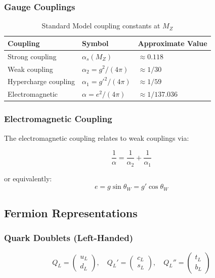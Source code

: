 \subsubsection{Gauge Couplings}

\begin{table}[h]
\centering
\begin{tabular}{|l|l|l|}
\hline
\textbf{Coupling} & \textbf{Symbol} & \textbf{Approximate Value} \\
\hline
Strong coupling & $\alpha_s(M_Z)$ & $\approx 0.118$ \\
Weak coupling & $\alpha_2 = g^2/(4\pi)$ & $\approx 1/30$ \\
Hypercharge coupling & $\alpha_1 = g'^2/(4\pi)$ & $\approx 1/59$ \\
Electromagnetic & $\alpha = e^2/(4\pi)$ & $\approx 1/137.036$ \\
\hline
\end{tabular}
\caption{Standard Model coupling constants at $M_Z$}
\label{tab:canonical:sm_couplings}
\end{table}

\subsubsection{Electromagnetic Coupling}

The electromagnetic coupling relates to weak couplings via:

\begin{equation}
\label{eq:canonical:em_coupling}
\frac{1}{\alpha} = \frac{1}{\alpha_2} + \frac{1}{\alpha_1}
\end{equation}

or equivalently:
\begin{equation}
e = g \sin\theta_W = g' \cos\theta_W
\end{equation}

\subsection{Fermion Representations}

\subsubsection{Quark Doublets (Left-Handed)}

\begin{equation}
Q_L = \begin{pmatrix} u_L \\ d_L \end{pmatrix}, \quad
Q_L' = \begin{pmatrix} c_L \\ s_L \end{pmatrix}, \quad
Q_L'' = \begin{pmatrix} t_L \\ b_L \end{pmatrix}
\end{equation}

